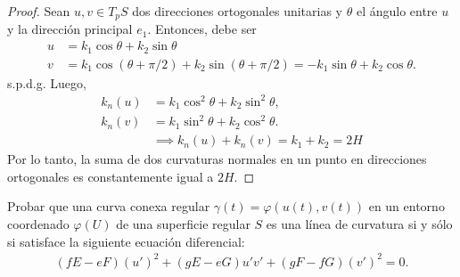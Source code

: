 \documentclass{article}
\newenvironment{theorem}[2][Ejercicio]{\begin{trivlist}
\item[\hskip \labelsep {\bfseries #1}\hskip \labelsep {\bfseries #2.}]}{\end{trivlist}}
\begin{document}
\begin{proof}
    Sean \( u, v \in T_p S \) dos direcciones ortogonales unitarias y \( \theta \) el ángulo entre \( u \) y la dirección principal \( e_1 \). Entonces, debe ser \begin{align*}
        u & = k_1 \cos \theta + k_2 \sin \theta                                                           \\
        v & = k_1 \cos (\theta + \pi/2) + k_2 \sin (\theta + \pi/2) = -k_1 \sin \theta + k_2 \cos \theta.
    \end{align*}
    s.p.d.g. Luego, \begin{align*}
        k_n(u) & = k_1 \cos^2 \theta + k_2 \sin^2 \theta,   \\
        k_n(v) & = k_1 \sin^2 \theta + k_2 \cos^2 \theta.   \\
               & \implies k_n(u) + k_n(v) = k_1 + k_2 = 2 H
    \end{align*}
    Por lo tanto, la suma de dos curvaturas normales en un punto en direcciones ortogonales es constantemente igual a \( 2H \).
\end{proof}

\vspace{1em}

\begin{theorem}{9}
    Probar que una curva conexa regular \( \gamma(t) = \varphi(u(t), v(t)) \) en un entorno coordenado
    \( \varphi(U) \) de una superficie regular \( S \) es una línea de curvatura si y sólo si satisface la siguiente ecuación diferencial: \begin{align*}
        (fE - eF) {(u')}^2 + (gE - eG) u'v'+ (gF - fG){(v')}^2 = 0.
    \end{align*}
\end{theorem}
\end{document}
